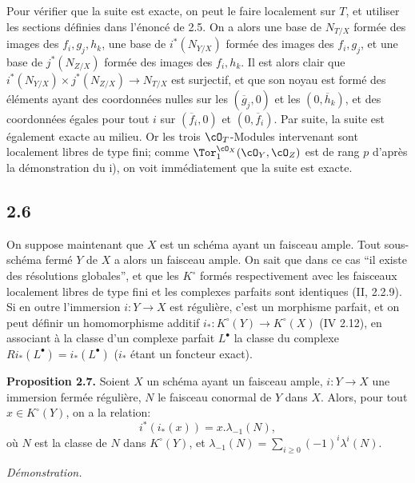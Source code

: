 Pour vérifier que la suite est exacte, on peut le faire localement sur \(T\), et utiliser les sections définies dans l'énoncé de 2.5. On a alors une base de \(N_{T/X}\) formée des images des \(f_i,g_j,h_k\), une base de \(i^*(N_{Y/X})\) formée des images des \(f_i,g_j\), et une base de \(j^*(N_{Z/X})\) formée des images des \(f_i,h_k\). Il est alors clair que \(i^*(N_{Y/X})\times j^*(N_{Z/X})\to N_{T/X}\) est surjectif, et que son noyau est formé des éléments ayant des coordonnées nulles sur les \((\overline g_j,0)\) et les \((0,\overline h_k)\), et des coordonnées égales pour tout \(i\) sur \((\overline f_i,0)\) et \((0,\overline f_i)\). Par suite, la suite est également exacte au milieu. Or les trois \(\cO_T\)-Modules intervenant sont localement libres de type fini; comme \(\Tor_1^{\cO_X}(\cO_Y,\cO_Z)\) est de rang \(p\) d'après la démonstration du i), on voit immédiatement que la suite est exacte.

\subsection*{2.6}
On suppose maintenant que \(X\) est un schéma ayant un faisceau ample. Tout sous-schéma fermé \(Y\) de \(X\) a alors un faisceau ample. On sait que dans ce cas ``il existe des résolutions globales'', et que les \(K^\circ\) formés respectivement avec les faisceaux localement libres de type fini et les complexes parfaits sont identiques (II, 2.2.9). Si en outre l'immersion \(i:Y\to X\) est régulière, c'est un morphisme parfait, et on peut définir un homomorphisme additif \(i_*:K^\circ(Y)\longrightarrow K^\circ(X)\) (IV 2.12), en associant à la classe d'un complexe parfait \(L^\bullet\) la classe du complexe \(Ri_*(L^\bullet)=i_*(L^\bullet)\) (\(i_*\) étant un foncteur exact).

\textbf{Proposition 2.7.} Soient \(X\) un schéma ayant un faisceau ample, \(i:Y\to X\) une immersion fermée régulière, \(N\) le faisceau conormal de \(Y\) dans \(X\). Alors, pour tout \(x\in K^\circ(Y)\), on a la relation:
\begin{equation}\tag{2.7.1}
i^*(i_*(x))=x.\lambda_{-1}(N),
\end{equation}
où \(N\) est la classe de \(N\) dans \(K^\circ(Y)\), et \(\lambda_{-1}(N)=\sum_{i\ge0}(-1)^i\lambda^i(N)\).

\emph{Démonstration.}
